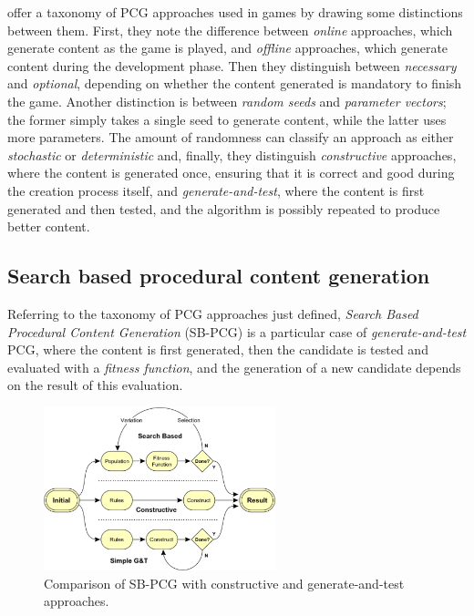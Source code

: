  offer a taxonomy of PCG approaches used in games by drawing some distinctions between them. First, they note the difference between \textit{online} approaches, which generate content as the game is played, and \textit{offline} approaches, which generate content during the development phase. Then they distinguish between \textit{necessary} and \textit{optional}, depending on whether the content generated is mandatory to finish the game. Another distinction is between \textit{random seeds} and \textit{parameter vectors}; the former simply takes a single seed to generate content, while the latter uses more parameters. The amount of randomness can classify an approach as either \textit{stochastic} or \textit{deterministic} and, finally, they distinguish \textit{constructive} approaches, where the content is generated once, ensuring that it is correct and good during the creation process itself, and \textit{generate-and-test}, where the content is first generated and then tested, and the algorithm is possibly repeated to produce better content. \cite{togelius_search-based_2010}

\subsection{Search based procedural content generation}
\label{subsec:search_based_pcg}
Referring to the taxonomy of PCG approaches just defined, \textit{Search Based Procedural Content Generation} (SB-PCG) is a particular case of \textit{generate-and-test} PCG, where the content is first generated, then the candidate is tested and evaluated with a \textit{fitness function}, and the generation of a new candidate depends on the result of this evaluation. \cite{togelius_search-based_2010}

\begin{figure}[hbt!]
    \centering
    \includegraphics[width=0.6\textwidth]{Images/Togelius.png}
    \caption{Comparison of SB-PCG with constructive and generate-and-test approaches.}
    \label{fig:pcg}
\end{figure}

